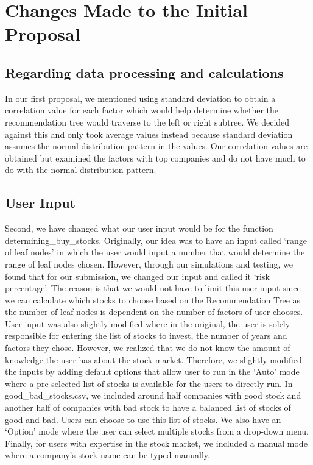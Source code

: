 \documentclass[fontsize=11pt]{article}
\begin{document}
\section{Changes Made to the Initial Proposal}
\subsection{Regarding data processing and calculations}
In our first proposal, we mentioned using standard deviation to obtain a correlation value for each factor which would help determine whether the recommendation tree would traverse to the left or right subtree. We decided against this and only took average values instead because standard deviation assumes the normal distribution pattern in the values. Our correlation values are obtained but examined the factors with top companies and do not have much to do with the normal distribution pattern. 

\subsection{User Input}
Second, we have changed what our user input would be for the function determining\_buy\_stocks. Originally, our idea was to have an input called `range of leaf nodes' in which the user would input a number that would determine the range of leaf nodes chosen. However, through our simulations and testing, we found that for our submission, we changed our input and called it `risk percentage'. The reason is that we would not have to limit this user input since we can calculate which stocks to choose based on the Recommendation Tree as the number of leaf nodes is dependent on the number of factors of user chooses. \\

User input was also slightly modified where in the original, the user is solely responsible for entering the list of stocks to invest, the number of years and factors they chose. However, we realized that we do not know the amount of knowledge the user has about the stock market. Therefore, we slightly modified the inputs by adding default options that allow user to run in the `Auto' mode where a pre-selected list of stocks is available for the users to directly run. In good\_bad\_stocks.csv, we included around half companies with good stock and another half of companies with bad stock to have a balanced list of stocks of good and bad. Users can choose to use this list of stocks. We also have an `Option' mode where the user can select multiple stocks from a drop-down menu. Finally, for users with expertise in the stock market, we included a manual mode where a company's stock name can be typed manually. \\
\end{document}
